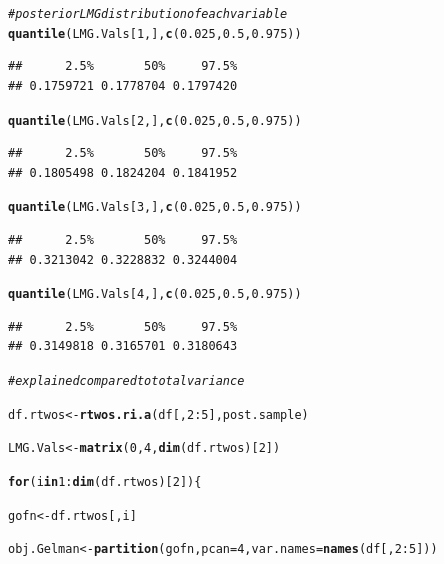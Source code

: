 \documentclass[11pt,a4paper,twoside]{book}
\makeatletter
\newcommand{\hlnum}[1]{\textcolor[rgb]{0.686,0.059,0.569}{#1}}%
\newcommand{\hlcom}[1]{\textcolor[rgb]{0.678,0.584,0.686}{\textit{#1}}}%
\newcommand{\hlopt}[1]{\textcolor[rgb]{0,0,0}{#1}}%
\newcommand{\hlstd}[1]{\textcolor[rgb]{0.345,0.345,0.345}{#1}}%
\newcommand{\hlkwa}[1]{\textcolor[rgb]{0.161,0.373,0.58}{\textbf{#1}}}%
\newcommand{\hlkwb}[1]{\textcolor[rgb]{0.69,0.353,0.396}{#1}}%
\newcommand{\hlkwc}[1]{\textcolor[rgb]{0.333,0.667,0.333}{#1}}%
\newcommand{\hlkwd}[1]{\textcolor[rgb]{0.737,0.353,0.396}{\textbf{#1}}}%
\newenvironment{kframe}{%
 \def\at@end@of@kframe{}%
 \ifinner\ifhmode%
  \def\at@end@of@kframe{\end{minipage}}%
  \begin{minipage}{\columnwidth}%
 \fi\fi%
 \def\FrameCommand##1{\hskip\@totalleftmargin \hskip-\fboxsep
 \colorbox{shadecolor}{##1}\hskip-\fboxsep
     \hskip-\linewidth \hskip-\@totalleftmargin \hskip\columnwidth}%
 \MakeFramed {\advance\hsize-\width
   \@totalleftmargin\z@ \linewidth\hsize
   \@setminipage}}%
 {\par\unskip\endMakeFramed%
 \at@end@of@kframe}
\newenvironment{knitrout}{}{} %
\makeatother
\begin{document}
\begin{knitrout}
\begin{kframe}
\begin{alltt}
\hlcom{# posterior LMG distribution of each variable}
\hlkwd{quantile}\hlstd{(LMG.Vals[}\hlnum{1}\hlstd{,],} \hlkwd{c}\hlstd{(}\hlnum{0.025}\hlstd{,} \hlnum{0.5}\hlstd{,} \hlnum{0.975}\hlstd{))}
\end{alltt}
\begin{verbatim}
##      2.5%       50%     97.5% 
## 0.1759721 0.1778704 0.1797420
\end{verbatim}
\begin{alltt}
\hlkwd{quantile}\hlstd{(LMG.Vals[}\hlnum{2}\hlstd{,],} \hlkwd{c}\hlstd{(}\hlnum{0.025}\hlstd{,} \hlnum{0.5}\hlstd{,} \hlnum{0.975}\hlstd{))}
\end{alltt}
\begin{verbatim}
##      2.5%       50%     97.5% 
## 0.1805498 0.1824204 0.1841952
\end{verbatim}
\begin{alltt}
\hlkwd{quantile}\hlstd{(LMG.Vals[}\hlnum{3}\hlstd{,],} \hlkwd{c}\hlstd{(}\hlnum{0.025}\hlstd{,} \hlnum{0.5}\hlstd{,} \hlnum{0.975}\hlstd{))}
\end{alltt}
\begin{verbatim}
##      2.5%       50%     97.5% 
## 0.3213042 0.3228832 0.3244004
\end{verbatim}
\begin{alltt}
\hlkwd{quantile}\hlstd{(LMG.Vals[}\hlnum{4}\hlstd{,],} \hlkwd{c}\hlstd{(}\hlnum{0.025}\hlstd{,} \hlnum{0.5}\hlstd{,} \hlnum{0.975}\hlstd{))}
\end{alltt}
\begin{verbatim}
##      2.5%       50%     97.5% 
## 0.3149818 0.3165701 0.3180643
\end{verbatim}
\begin{alltt}
\hlcom{# explained compared to total variance}

\hlstd{df.rtwos} \hlkwb{<-} \hlkwd{rtwos.ri.a}\hlstd{(df[,}\hlnum{2}\hlopt{:}\hlnum{5}\hlstd{], post.sample)}

\hlstd{LMG.Vals}\hlkwb{<-}\hlkwd{matrix}\hlstd{(}\hlnum{0}\hlstd{,} \hlnum{4}\hlstd{,} \hlkwd{dim}\hlstd{(df.rtwos)[}\hlnum{2}\hlstd{])}

\hlkwa{for}\hlstd{(i} \hlkwa{in} \hlnum{1}\hlopt{:}\hlkwd{dim}\hlstd{(df.rtwos)[}\hlnum{2}\hlstd{])\{}

        \hlstd{gofn}\hlkwb{<-}\hlstd{df.rtwos[,i]}

        \hlstd{obj.Gelman}\hlkwb{<-}\hlkwd{partition}\hlstd{(gofn,} \hlkwc{pcan} \hlstd{=} \hlnum{4}\hlstd{,} \hlkwc{var.names} \hlstd{=} \hlkwd{names}\hlstd{(df[,}\hlnum{2}\hlopt{:}\hlnum{5}\hlstd{]))}


\end{alltt}
\end{kframe}
\end{knitrout}
\end{document}
